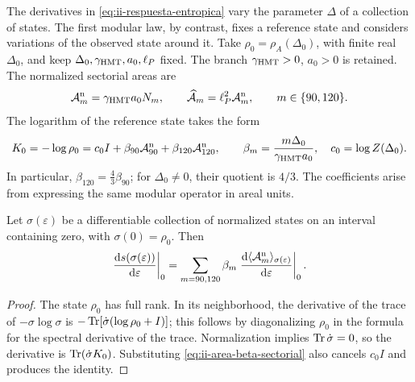 The derivatives in \eqref{eq:ii-respuesta-entropica} vary the parameter
\(\Delta\) of a collection of states. The first modular law, by contrast, fixes
a reference state and considers variations of the observed state
around it. Take
\(\rho_0=\rho_A(\Delta_0)\), with finite real \(\Delta_0\),
and keep \(\Delta_0,\gamma_{\mathrm{HMT}},a_0,\ell_P\) fixed.
The branch \(\gamma_{\mathrm{HMT}}>0\), \(a_0>0\) is retained.
The normalized sectorial areas are
\begin{equation}
 \mathcal A_m^{\rm n}=\gamma_{\mathrm{HMT}}a_0N_m,
 \qquad
 \widehat{\mathcal A}_m=\ell_P^2\mathcal A_m^{\rm n},
 \qquad m\in\{90,120\}.
 \label{eq:ii-area-sector-normalizado}
\end{equation}
The logarithm of the reference state takes the form
\begin{equation}
 K_0=-\log\rho_0
 =c_0I+\beta_{90}\mathcal A_{90}^{\rm n}
         +\beta_{120}\mathcal A_{120}^{\rm n},
 \qquad
 \beta_m=\frac{m\Delta_0}{\gamma_{\mathrm{HMT}}a_0},
 \quad c_0=\log Z(\Delta_0).
 \label{eq:ii-area-beta-sectorial}
\end{equation}
In particular, \(\beta_{120}=\tfrac43\beta_{90}\); for
\(\Delta_0\ne0\), their quotient is \(4/3\). The coefficients
arise from expressing the same modular operator in areal units.

\begin{theorem}
\label{thm:ii-area-primera-ley}
Let \(\sigma(\varepsilon)\) be a differentiable collection of normalized
states on an interval containing zero, with
\(\sigma(0)=\rho_0\). Then
\begin{equation}
 \left.\frac{\mathrm d s(\sigma(\varepsilon))}{\mathrm d\varepsilon}\right|_0
 =\sum_{m=90,120}\beta_m
   \left.\frac{\mathrm d\langle\mathcal A_m^{\rm n}\rangle_
                       {\sigma(\varepsilon)}}{\mathrm d\varepsilon}\right|_0.
 \label{eq:ii-area-primera-ley}
\end{equation}
\end{theorem}
\begin{proof}
The state \(\rho_0\) has full rank. In its neighborhood, the derivative
of the trace of \(-\sigma\log\sigma\) is
\(-\operatorname{Tr}[\dot\sigma(\log\rho_0+I)]\); this follows by diagonalizing
\(\rho_0\) in the formula for the spectral derivative of the trace.
Normalization implies \(\operatorname{Tr}\dot\sigma=0\), so the
derivative is \(\operatorname{Tr}(\dot\sigma K_0)\). Substituting
\eqref{eq:ii-area-beta-sectorial} also cancels \(c_0I\) and
produces the identity.
\end{proof}

